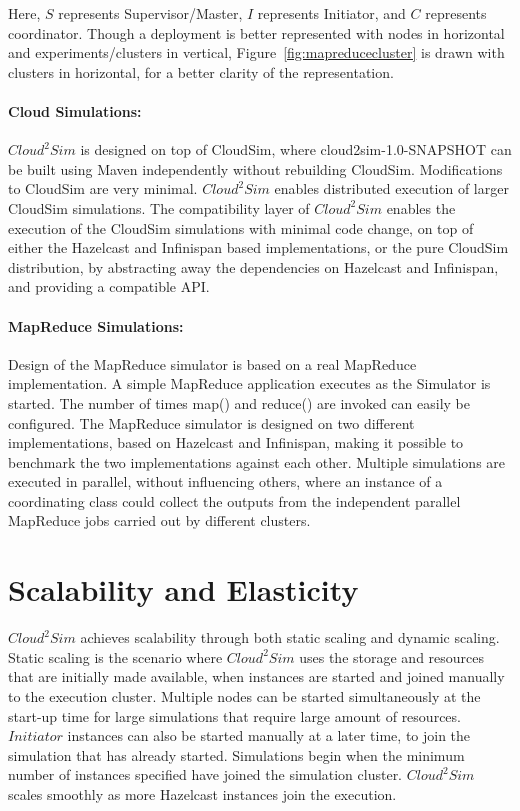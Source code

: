 Here, $S$ represents Supervisor/Master, $I$ represents Initiator, and $C$ represents coordinator. Though a deployment is better represented with nodes in horizontal and experiments/clusters in vertical, Figure~\ref{fig:mapreducecluster} is drawn with clusters in horizontal, for a better clarity of the representation.

\paragraph*{Cloud Simulations:}
$Cloud^{2}Sim$ is designed on top of CloudSim, where cloud2sim-1.0-SNAPSHOT can be built using Maven independently without rebuilding CloudSim. Modifications to CloudSim are very minimal. $Cloud^{2}Sim$ enables distributed execution of larger CloudSim simulations. The compatibility layer of $Cloud^{2}Sim$ enables the execution of the CloudSim simulations with minimal code change, on top of either the Hazelcast and Infinispan based implementations, or the pure CloudSim distribution, by abstracting away the dependencies on Hazelcast and Infinispan, and providing a compatible API. 

\paragraph*{MapReduce Simulations:}
Design of the MapReduce simulator is based on a real MapReduce implementation. A simple MapReduce application executes as the Simulator is started. The number of times map() and reduce() are invoked can easily be configured. The MapReduce simulator is designed on two different implementations, based on Hazelcast and Infinispan, making it possible to benchmark the two implementations against each other. Multiple simulations are executed in parallel, without influencing others, where an instance of a coordinating class could collect the outputs from the independent parallel MapReduce jobs carried out by different clusters. 

\section{Scalability and Elasticity}
\label{sec:3se}
$Cloud^{2}Sim$ achieves scalability through both static scaling and dynamic scaling. Static scaling is the scenario where $Cloud^{2}Sim$ uses the storage and resources that are initially made available, when instances are started and joined manually to the execution cluster. Multiple nodes can be started simultaneously at the start-up time for large simulations that require large amount of resources. $Initiator$ instances can also be started manually at a later time, to join the simulation that has already started. Simulations begin when the minimum number of instances specified have joined the simulation cluster. $Cloud^{2}Sim$ scales smoothly as more Hazelcast instances join the execution. 

